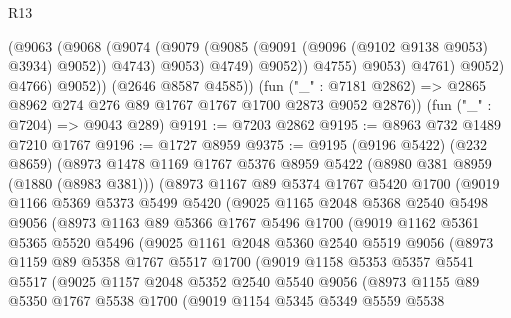 \begin{lexlean}{R13}
\begin{coremodule}
                        (@9063
                          (@9068
                            (@9074
                              (@9079 (@9085 (@9091 (@9096 (@9102 @9138 @9053) @3934) @9052)) @4743)
                              @9053)
                            @4749)
                          @9052))
                      @4755)
                    @9053)
                  @4761)
                @9052)
              @4766)
            @9052))
        (@2646 @8587 @4585))
      (fun ("_" : @7181 @2862) => @2865 @8962 @274 @276 @89 @1767 @1767 @1700 @2873 @9052 @2876))
    (fun ("_" : @7204) => @9043 @289)
@9191 := @7203 @2862
@9195 := @8963 @732 @1489 @7210 @1767
@9196 := @1727 @8959
@9375 := @9195
    (@9196 @5422)
    (@232 @8659)
    (@8973
      @1478
      @1169
      @1767
      @5376
      @8959
      @5422
      (@8980 @381 @8959 (@1880 (@8983 @381)))
      (@8973
        @1167
        @89
        @5374
        @1767
        @5420
        @1700
        (@9019
          @1166
          @5369
          @5373
          @5499
          @5420
          (@9025
            @1165
            @2048
            @5368
            @2540
            @5498
            @9056
            (@8973
              @1163
              @89
              @5366
              @1767
              @5496
              @1700
              (@9019
                @1162
                @5361
                @5365
                @5520
                @5496
                (@9025
                  @1161
                  @2048
                  @5360
                  @2540
                  @5519
                  @9056
                  (@8973
                    @1159
                    @89
                    @5358
                    @1767
                    @5517
                    @1700
                    (@9019
                      @1158
                      @5353
                      @5357
                      @5541
                      @5517
                      (@9025
                        @1157
                        @2048
                        @5352
                        @2540
                        @5540
                        @9056
                        (@8973
                          @1155
                          @89
                          @5350
                          @1767
                          @5538
                          @1700
                          (@9019
                            @1154
                            @5345
                            @5349
                            @5559
                            @5538

\end{coremodule}
\end{lexlean}
